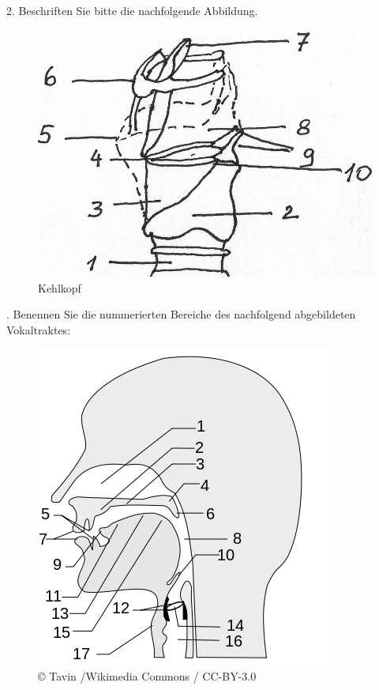 \documentclass[11pt]{book}
\begin{document}
2. Beschriften Sie bitte die nachfolgende Abbildung.
\begin{figure}[htbp]
\begin{center}
\includegraphics[scale=3]{grafiken/sprechen/kehlkopf}
\caption{Kehlkopf}
\label{fig2}
\end{center}
\end{figure}

.	Benennen Sie die nummerierten Bereiche des nachfolgend abgebildeten Vokaltraktes:
\begin{figure}[htbp]
\begin{center}
\includegraphics[scale=0.6]{grafiken/sprechen/kopf}
\caption{©  Tavin /Wikimedia Commons / CC-BY-3.0}
\label{fig3}
\end{center}
\end{figure}
\end{document}
